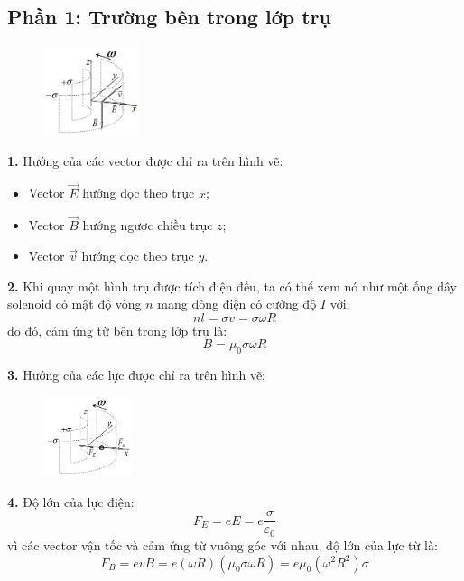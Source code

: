 \subsection*{Phần 1: Trường bên trong lớp trụ}
\begin{figure}
  \centering
  \vspace{-12mm}
  \includegraphics[width=0.25\textwidth]{Figures/P2/Fig 2.1S.png}
\end{figure}

\noindent\textbf{1.} Hướng của các vector được chỉ ra trên hình vẽ:
\begin{itemize}
  \item Vector $\vec{E}$ hướng dọc theo trục $x$;
  \item Vector $\vec{B}$ hướng ngược chiều trục $z$;
  \item Vector $\vec{v}$ hướng dọc theo trục $y$.
\end{itemize}

\noindent\textbf{2.} Khi quay một hình trụ được tích điện đều, ta có thể xem nó như một ống dây solenoid có mật độ vòng $n$ mang dòng điện có cường độ $I$ với:
\begin{equation*}
  nl=\sigma v=\sigma\omega R
\end{equation*}
do đó, cảm ứng từ bên trong lớp trụ là:
\begin{equation*}
  B=\mu_{0}\sigma\omega R
\end{equation*}

\noindent\textbf{3.} Hướng của các lực được chỉ ra trên hình vẽ:
\begin{figure}[h]
  \centering
  \includegraphics[width=0.23\textwidth]{Figures/P2/Fig 2.2S.png}
\end{figure}

\noindent\textbf{4.} Độ lớn của lực điện:
\begin{equation*}
  F_{E}=eE=e\frac{\sigma}{\varepsilon_{0}}
\end{equation*}
vì các vector vận tốc và cảm ứng từ vuông góc với nhau, độ lớn của lực từ là:
\begin{equation*}
  F_{B}=evB=e(\omega R)(\mu_{0}\sigma\omega R)=e\mu_{0}(\omega^{2}R^{2})\sigma
\end{equation*}

